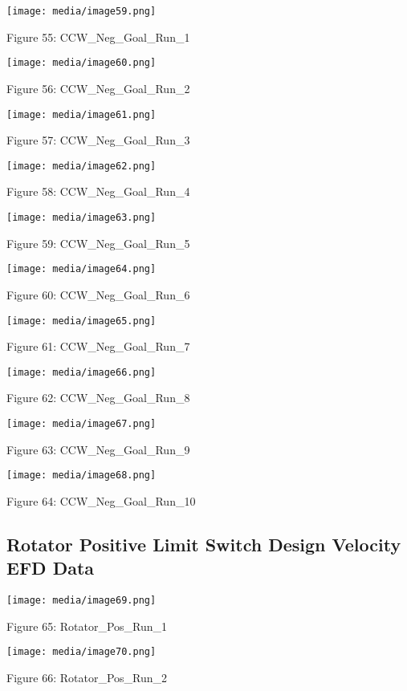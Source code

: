 \documentclass[SE,lsstdraft,authoryear,toc]{lsstdoc}
\begin{document}
\texttt{[image: media/image59.png]}

Figure 55: CCW\_Neg\_Goal\_Run\_1

\texttt{[image: media/image60.png]}

Figure 56: CCW\_Neg\_Goal\_Run\_2

\texttt{[image: media/image61.png]}

Figure 57: CCW\_Neg\_Goal\_Run\_3

\texttt{[image: media/image62.png]}

Figure 58: CCW\_Neg\_Goal\_Run\_4

\texttt{[image: media/image63.png]}

Figure 59: CCW\_Neg\_Goal\_Run\_5

\texttt{[image: media/image64.png]}

Figure 60: CCW\_Neg\_Goal\_Run\_6

\texttt{[image: media/image65.png]}

Figure 61: CCW\_Neg\_Goal\_Run\_7

\texttt{[image: media/image66.png]}

Figure 62: CCW\_Neg\_Goal\_Run\_8

\texttt{[image: media/image67.png]}

Figure 63: CCW\_Neg\_Goal\_Run\_9

\texttt{[image: media/image68.png]}

Figure 64: CCW\_Neg\_Goal\_Run\_10

\hypertarget{rotator-positive-limit-switch-design-velocity-efd-data}{%
\subsection{Rotator Positive Limit Switch Design Velocity EFD
Data}\label{rotator-positive-limit-switch-design-velocity-efd-data}}

\texttt{[image: media/image69.png]}

Figure 65: Rotator\_Pos\_Run\_1

\texttt{[image: media/image70.png]}

Figure 66: Rotator\_Pos\_Run\_2
\end{document}
